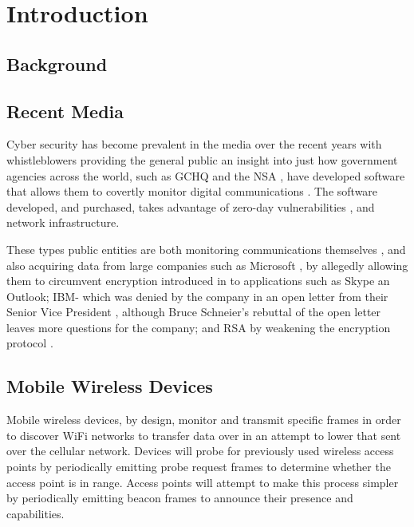 \section {Introduction}
\subsection{Background}
\subsection{Recent Media}
Cyber security has become prevalent in the media over the recent years with whistleblowers \cite{intro:guardian_snowden} providing the general public an insight into just how government agencies across the world, such as GCHQ \cite{intro:gchq_home}  and the NSA  \cite{intro:nsa_home}, have developed software \cite{intro:schneier_nsa_1}\cite{intro:schneier_nsa_3} that allows them to covertly monitor digital communications \cite{intro:schneier_nsa_4}. The software developed, and purchased, takes advantage of zero-day vulnerabilities \cite{intro:nsa_invoice}, and network infrastructure.

These types public entities are both monitoring communications themselves \cite{intro:schneier_nsa_2}, and also acquiring data from large companies such as Microsoft \cite{intro:guardian_ms_nsa}, by allegedly allowing them to circumvent encryption introduced in to applications such as Skype an Outlook; IBM- which was denied by the company in an open letter from their Senior Vice President \cite{intro:ibm_open_letter}, although Bruce Schneier’s rebuttal \cite{intro:open_open_letter} of the open letter leaves more questions for the company; and RSA by weakening the encryption protocol \cite{intro:bristol_open_letter}.

\subsection{Mobile Wireless Devices}
Mobile wireless devices, by design, monitor and transmit specific frames in order to discover WiFi networks to transfer data over in an attempt to lower that sent over the cellular network. Devices will probe for previously used wireless access points by periodically emitting probe request frames to determine whether the access point is in range. Access points will attempt to make this process simpler by periodically emitting beacon frames to announce their presence and capabilities.

